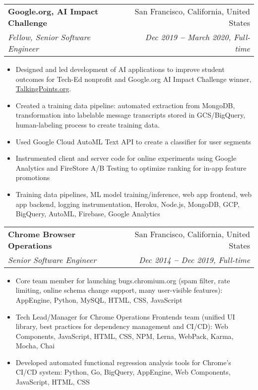 \documentclass[letterpaper,11pt]{article}
\makeatletter
\newcommand{\resumeItem}[1]{
  \item\small{
    {#1 \vspace{-2pt}}
  }
}
\newcommand{\resumeSubheading}[4]{
  \vspace{-2pt}\item
    \begin{tabular*}{0.97\textwidth}[t]{l@{\extracolsep{\fill}}r}
      \textbf{#1} & #2 \\
      \textit{\small#3} & \textit{\small #4} \\
    \end{tabular*}\vspace{-7pt}
}
\newcommand{\resumeItemListStart}{\begin{itemize}}
\newcommand{\resumeItemListEnd}{\end{itemize}\vspace{-5pt}}
\makeatother
\begin{document}
    \resumeSubheading
      {Google.org, AI Impact Challenge}{San Francisco, California, United States}
      {Fellow, Senior Software Engineer}{Dec 2019 \textbf{--} March 2020, Full-time}
        \resumeItemListStart
            \resumeItem{Designed and led development of AI applications to improve student outcomes for Tech-Ed nonprofit and Google.org AI Impact Challenge winner, \href{https://talkingpts.org/blog/googlepressrelease/1/}{TalkingPoints.org}.}
            \resumeItem{Created a training data pipeline: automated extraction from MongoDB, transformation into labelable message transcripts stored in GCS/BigQuery, human-labeling process to create training data.}
            \resumeItem{Used Google Cloud AutoML Text API to create a classifier for user segments}
            \resumeItem{Instrumented client and server code for online experiments using Google Analytics and FireStore A/B Testing to optimize ranking for in-app feature promotions}
            \resumeItem{Training data pipelines, ML model training/inference, web app frontend, web app backend, logging instrumentation, Heroku, Node.js, MongoDB, GCP, BigQuery, AutoML, Firebase, Google Analytics}
        \resumeItemListEnd

    \resumeSubheading
      {Chrome Browser Operations}{San Francisco, California, United States}
      {Senior Software Engineer}{Dec 2014 \textbf{--} Dec 2019, Full-time}
      \resumeItemListStart
          \resumeItem{Core team member for launching bugs.chromium.org (spam filter, rate limiting, online schema change support, many user-visible features): AppEngine, Python, MySQL, HTML, CSS, JavaScript}
          \resumeItem{Tech Lead/Manager for Chrome Operations Frontends team (unified UI library, best practices for dependency management and CI/CD): Web Components, JavaScript, HTML, CSS, NPM, Lerna, WebPack, Karma, Mocha, Chai }
          \resumeItem{Developed automated functional regression analysis tools for Chrome's CI/CD system: Python, Go, BigQuery, AppEngine, Web Components, JavaScript, HTML, CSS}
      \resumeItemListEnd
\end{document}
